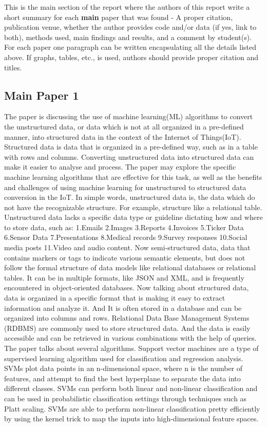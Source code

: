 \documentclass[]{tukseminar}
\begin{document}
This is the main section of the report where the authors of this report write a short summary for each \textbf{main} paper that was found - A proper citation,
publication venue, whether the author provides code and/or data (if yes, link to
both), methods used, main findings and results, and a comment by student(s). For each paper one paragraph can be written encapsulating all the details listed above. If graphs, tables, etc., is used, authors should provide proper citation and titles. 


\subsection{Main Paper 1}
The paper is discussing the use of machine learning(ML) algorithms to convert the unstructured data, or data which is not at all organized in a pre-defined manner, into structured data in the context of the Internet of Things(IoT). Structured data is data that is organized in a pre-defined way, such as in a table with rows and columns. Converting unstructured data into structured data can make it easier to analyse and process. The paper may explore the specific machine learning algorithms that are effective for this task, as well as the benefits and challenges of using machine learning for unstructured to structured data conversion in the IoT.
In simple words, unstructured data is, the data which do not have the recognizable structure. For example, structure like a relational table. Unstructured data lacks a specific data type or guideline dictating how and where to store data, such as:
1.Emails
2.Images
3.Reports
4.Invoices
5.Ticker Data 
6.Sensor Data
7.Presentations
8.Medical records
9.Survey responses
10.Social media posts
11.Video and audio content.
Now semi-structured data, data that contains markers or tags to indicate various semantic elements, but does not follow the formal structure of data models like relational databases or relational tables. It can be in multiple formats, like JSON and XML, and is frequently encountered in object-oriented databases. %
Now talking about structured data, data is organized in a specific format that is making it easy to extract information and analyze it. And It is often stored in a database and can be organized into columns and rows. Relational Data Base Management Systems (RDBMS) are commonly used to store structured data. And the data is easily accessible and can be retrieved in various combinations with the help of queries. The paper talks about several algorithms. %
Support vector machines are a type of supervised learning algorithm used for classification and regression analysis. SVMs plot data points in an n-dimensional space, where n is the number of features, and attempt to find the best hyperplane to separate the data into different classes. SVMs can perform both linear and non-linear classification and can be used in probabilistic classification settings through techniques such as Platt scaling. SVMs are able to perform non-linear classification pretty efficiently by using the kernel trick to map the inputs into high-dimensional feature spaces.%
\end{document}
